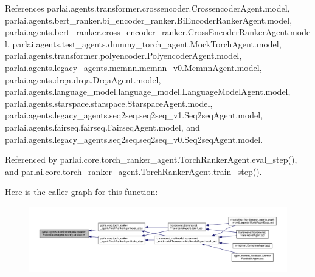 References parlai.\+agents.\+transformer.\+crossencoder.\+Crossencoder\+Agent.\+model, parlai.\+agents.\+bert\+\_\+ranker.\+bi\+\_\+encoder\+\_\+ranker.\+Bi\+Encoder\+Ranker\+Agent.\+model, parlai.\+agents.\+bert\+\_\+ranker.\+cross\+\_\+encoder\+\_\+ranker.\+Cross\+Encoder\+Ranker\+Agent.\+model, parlai.\+agents.\+test\+\_\+agents.\+dummy\+\_\+torch\+\_\+agent.\+Mock\+Torch\+Agent.\+model, parlai.\+agents.\+transformer.\+polyencoder.\+Polyencoder\+Agent.\+model, parlai.\+agents.\+legacy\+\_\+agents.\+memnn.\+memnn\+\_\+v0.\+Memnn\+Agent.\+model, parlai.\+agents.\+drqa.\+drqa.\+Drqa\+Agent.\+model, parlai.\+agents.\+language\+\_\+model.\+language\+\_\+model.\+Language\+Model\+Agent.\+model, parlai.\+agents.\+starspace.\+starspace.\+Starspace\+Agent.\+model, parlai.\+agents.\+legacy\+\_\+agents.\+seq2seq.\+seq2seq\+\_\+v1.\+Seq2seq\+Agent.\+model, parlai.\+agents.\+fairseq.\+fairseq.\+Fairseq\+Agent.\+model, and parlai.\+agents.\+legacy\+\_\+agents.\+seq2seq.\+seq2seq\+\_\+v0.\+Seq2seq\+Agent.\+model.



Referenced by parlai.\+core.\+torch\+\_\+ranker\+\_\+agent.\+Torch\+Ranker\+Agent.\+eval\+\_\+step(), and parlai.\+core.\+torch\+\_\+ranker\+\_\+agent.\+Torch\+Ranker\+Agent.\+train\+\_\+step().

Here is the caller graph for this function\+:
\nopagebreak
\begin{figure}[H]
\begin{center}
\leavevmode
\includegraphics[width=350pt]{classparlai_1_1agents_1_1transformer_1_1polyencoder_1_1PolyencoderAgent_ad75794f4004267ab538258bc2571235f_icgraph}
\end{center}
\end{figure}
\mbox{\label{classparlai_1_1agents_1_1transformer_1_1polyencoder_1_1PolyencoderAgent_a02cea5573a5135f5a7201c49296abded}} 

